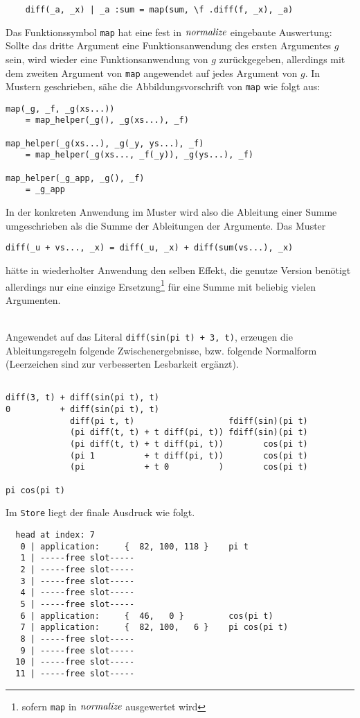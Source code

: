\verb~    diff(_a, _x) | _a :sum = map(sum, \f .diff(f, _x), _a)~

Das Funktionssymbol \verb|map| hat eine fest in $\mathit{normalize}$ eingebaute Auswertung: Sollte das dritte Argument eine Funktionsanwendung des ersten Argumentes $g$ sein, wird wieder eine Funktionsanwendung von $g$ zurückgegeben, allerdings mit dem zweiten Argument von \verb|map| angewendet auf jedes Argument von $g$. In Mustern geschrieben, sähe die Abbildungsvorschrift von \verb|map| wie folgt aus:

\begin{verbatim}
map(_g, _f, _g(xs...)) 
    = map_helper(_g(), _g(xs...), _f)

map_helper(_g(xs...), _g(_y, ys...), _f) 
    = map_helper(_g(xs..., _f(_y)), _g(ys...), _f)

map_helper(_g_app, _g(), _f) 
    = _g_app
\end{verbatim}

In der konkreten Anwendung im Muster wird also die Ableitung einer Summe umgeschrieben als die Summe der Ableitungen der Argumente. Das Muster

\verb|diff(_u + vs..., _x) = diff(_u, _x) + diff(sum(vs...), _x)|

hätte in wiederholter Anwendung den selben Effekt, die genutze Version benötigt allerdings nur eine einzige Ersetzung\footnote{sofern \texttt{map} in $\mathit{normalize}$ ausgewertet wird} für eine Summe mit beliebig vielen Argumenten.

\begin{beispiel}~\\
Angewendet auf das Literal \verb|diff(sin(pi t) + 3, t)|, erzeugen die Ableitungsregeln folgende Zwischenergebnisse, bzw. folgende Normalform (Leerzeichen sind zur verbesserten Lesbarkeit ergänzt).
\begin{verbatim}

diff(3, t) + diff(sin(pi t), t)
0          + diff(sin(pi t), t)
             diff(pi t, t)                   fdiff(sin)(pi t)
             (pi diff(t, t) + t diff(pi, t)) fdiff(sin)(pi t)
             (pi diff(t, t) + t diff(pi, t))        cos(pi t)
             (pi 1          + t diff(pi, t))        cos(pi t)
             (pi            + t 0          )        cos(pi t)
             
pi cos(pi t)
\end{verbatim}
Im \verb|Store| liegt der finale Ausdruck wie folgt.
\begin{verbatim}
  head at index: 7
   0 | application:     {  82, 100, 118 }    pi t
   1 | -----free slot-----
   2 | -----free slot-----
   3 | -----free slot-----
   4 | -----free slot-----
   5 | -----free slot-----
   6 | application:     {  46,   0 }         cos(pi t)
   7 | application:     {  82, 100,   6 }    pi cos(pi t)
   8 | -----free slot-----
   9 | -----free slot-----
  10 | -----free slot-----
  11 | -----free slot-----
\end{verbatim}
\end{beispiel}

